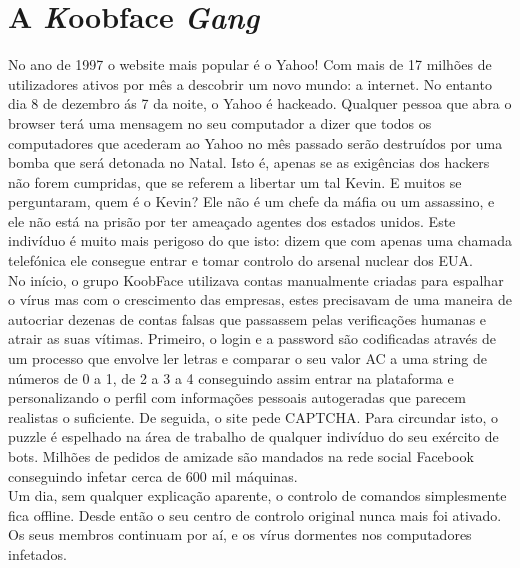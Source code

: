 \documentclass{report}
\begin{document}
\section{A \textit Koobface \textit{Gang}}
No ano de 1997 o website mais popular é o Yahoo! Com mais de 17 milhões de utilizadores ativos por mês a descobrir um novo mundo: a internet. No entanto dia 8 de dezembro ás 7 da noite, o Yahoo é hackeado. Qualquer pessoa que abra o browser terá uma mensagem no seu computador a dizer que todos os computadores que acederam ao Yahoo no mês passado serão destruídos por uma bomba que será detonada no Natal. Isto é, apenas se as exigências dos hackers não forem cumpridas, que se referem a libertar um tal Kevin. E muitos se perguntaram, quem é o Kevin? Ele não é um chefe da máfia ou um assassino, e ele não está na prisão por ter ameaçado agentes dos estados unidos. Este indivíduo é muito mais perigoso do que isto: dizem que com apenas uma chamada telefónica ele consegue entrar e tomar controlo do arsenal nuclear dos EUA.\\ \indent No início, o grupo KoobFace utilizava contas manualmente criadas para espalhar o vírus mas com o crescimento das empresas, estes precisavam de uma maneira de autocriar dezenas de contas falsas que passassem pelas verificações humanas e atrair as suas vítimas. Primeiro, o login e a password são codificadas através de um processo que envolve ler letras e comparar o seu valor AC a uma string de números de 0 a 1, de 2 a 3 a 4 conseguindo assim entrar na plataforma e personalizando o perfil com informações pessoais autogeradas que parecem realistas o suficiente. De seguida, o site pede CAPTCHA. Para circundar isto, o puzzle é espelhado na área de trabalho de qualquer indivíduo do seu exército de bots. Milhões de pedidos de amizade são mandados na rede social Facebook conseguindo infetar cerca de 600 mil máquinas.\\ \indent Um dia, sem qualquer explicação aparente, o controlo de comandos simplesmente fica offline. Desde então o seu centro de controlo original nunca mais foi ativado. Os seus membros continuam por aí, e os vírus dormentes nos computadores infetados.
\\
\end{document}
